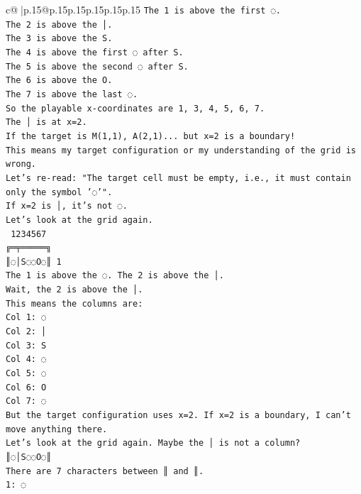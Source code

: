 \documentclass{article}
\begin{document}
{\begin{supertabular}{c@{$\;$}|p{.15\linewidth}@{}p{.15\linewidth}p{.15\linewidth}p{.15\linewidth}p{.15\linewidth}p{.15\linewidth}}
{{{\texttt{The 1 is above the first ◌.} \\
\texttt{The 2 is above the │.} \\
\texttt{The 3 is above the S.} \\
\texttt{The 4 is above the first ◌ after S.} \\
\texttt{The 5 is above the second ◌ after S.} \\
\texttt{The 6 is above the O.} \\
\texttt{The 7 is above the last ◌.} \\
\texttt{So the playable x{-}coordinates are 1, 3, 4, 5, 6, 7.} \\
\texttt{The │ is at x=2.} \\
\texttt{If the target is M(1,1), A(2,1)... but x=2 is a boundary!} \\
\texttt{This means my target configuration or my understanding of the grid is wrong.} \\
\texttt{Let's re{-}read: "The target cell must be empty, i.e., it must contain only the symbol '◌'".} \\
\texttt{If x=2 is │, it's not ◌.} \\
\texttt{Let's look at the grid again.} \\
\texttt{ 1234567} \\
\texttt{╔═╤═════╗} \\
\texttt{║◌│S◌◌O◌║ 1} \\
\texttt{The 1 is above the ◌. The 2 is above the │.} \\
\texttt{Wait, the 2 is above the │.} \\
\texttt{This means the columns are:} \\
\texttt{Col 1: ◌} \\
\texttt{Col 2: │} \\
\texttt{Col 3: S} \\
\texttt{Col 4: ◌} \\
\texttt{Col 5: ◌} \\
\texttt{Col 6: O} \\
\texttt{Col 7: ◌} \\
\texttt{But the target configuration uses x=2. If x=2 is a boundary, I can't move anything there.} \\
\texttt{Let's look at the grid again. Maybe the │ is not a column?} \\
\texttt{║◌│S◌◌O◌║} \\
\texttt{There are 7 characters between ║ and ║.} \\
\texttt{1: ◌} \\
}}}
\end{supertabular}}
\end{document}
